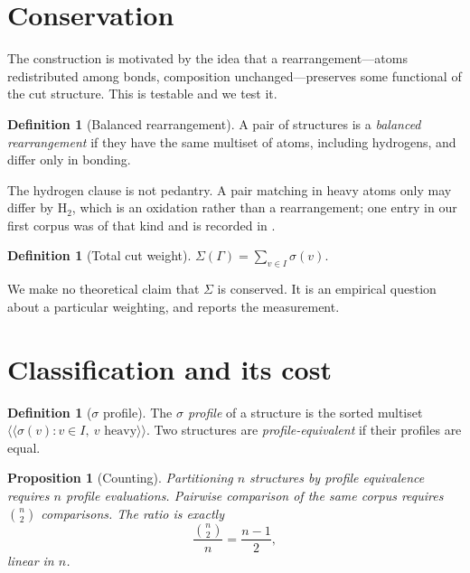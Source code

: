 \documentclass[11pt,twocolumn,a4paper]{article}
\theoremstyle{upthm}
\newtheorem{proposition}[theorem]{Proposition}
\theoremstyle{definition}
\newtheorem{definition}[theorem]{Definition}
\theoremstyle{remark}
\newcommand{\Gph}{\Gamma}
\newcommand{\sep}{\sigma}
\begin{document}
\section{Conservation}
\label{sec:conservation}

The construction is motivated by the idea that a rearrangement---atoms
redistributed among bonds, composition unchanged---preserves some
functional of the cut structure. This is testable and we test it.

\begin{definition}[Balanced rearrangement]
\label{def:balanced}
A pair of structures is a \emph{balanced rearrangement} if they have the
same multiset of atoms, including hydrogens, and differ only in bonding.
\end{definition}

The hydrogen clause is not pedantry. A pair matching in heavy atoms only
may differ by $\mathrm{H}_2$, which is an oxidation rather than a
rearrangement; one entry in our first corpus was of that kind and is
recorded in .

\begin{definition}[Total cut weight]
\label{def:total}
$\Sigma(\Gph)=\sum_{v\in I}\sep(v)$.
\end{definition}

We make no theoretical claim that $\Sigma$ is conserved. It is an
empirical question about a particular weighting, and
 reports the measurement.

\section{Classification and its cost}
\label{sec:cost}

\begin{definition}[$\sep$ profile]
\label{def:profile}
The \emph{$\sep$ profile} of a structure is the sorted multiset
$\langle\!\langle\sep(v):v\in I,\ v\text{ heavy}\rangle\!\rangle$. Two
structures are \emph{profile-equivalent} if their profiles are equal.
\end{definition}

\begin{proposition}[Counting]
\label{prop:counting}
Partitioning $n$ structures by profile equivalence requires $n$ profile
evaluations. Pairwise comparison of the same corpus requires
$\binom{n}{2}$ comparisons. The ratio is exactly
\[
\frac{\binom{n}{2}}{n}=\frac{n-1}{2},
\]
linear in $n$.
\end{proposition}
\end{document}
